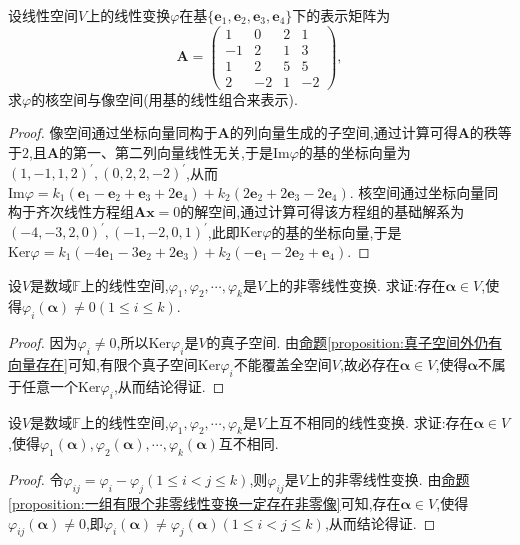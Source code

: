 \documentclass[lang=cn,newtx,10pt,scheme=chinese]{elegantbook}
\begin{document}
\begin{example}
设线性空间\(V\)上的线性变换\(\varphi\)在基\(\{\boldsymbol{e}_1,\boldsymbol{e}_2,\boldsymbol{e}_3,\boldsymbol{e}_4\}\)下的表示矩阵为
\[
\boldsymbol{A}=\begin{pmatrix}
1&0&2&1\\
-1&2&1&3\\
1&2&5&5\\
2&-2&1&-2
\end{pmatrix},
\]
求\(\varphi\)的核空间与像空间(用基的线性组合来表示).
\end{example}
\begin{proof}
    像空间通过坐标向量同构于\(\boldsymbol{A}\)的列向量生成的子空间,通过计算可得\(\boldsymbol{A}\)的秩等于\(2\),且\(\boldsymbol{A}\)的第一、第二列向量线性无关,于是\(\text{Im}\varphi\)的基的坐标向量为\((1,-1,1,2)^\prime,(0,2,2,-2)^\prime\),从而\(\text{Im}\varphi = k_1(\boldsymbol{e}_1 - \boldsymbol{e}_2 + \boldsymbol{e}_3 + 2\boldsymbol{e}_4)+k_2(2\boldsymbol{e}_2 + 2\boldsymbol{e}_3 - 2\boldsymbol{e}_4)\). 核空间通过坐标向量同构于齐次线性方程组\(\boldsymbol{A}\boldsymbol{x}=0\)的解空间,通过计算可得该方程组的基础解系为\((-4,-3,2,0)^\prime,(-1,-2,0,1)^\prime\),此即\(\text{Ker}\varphi\)的基的坐标向量,于是\(\text{Ker}\varphi = k_1(-4\boldsymbol{e}_1 - 3\boldsymbol{e}_2 + 2\boldsymbol{e}_3)+k_2(-\boldsymbol{e}_1 - 2\boldsymbol{e}_2 + \boldsymbol{e}_4)\).
\end{proof}

\begin{proposition}\label{proposition:一组有限个非零线性变换一定存在非零像}
设\(V\)是数域\(\mathbb{F}\)上的线性空间,\(\varphi_1,\varphi_2,\cdots,\varphi_k\)是\(V\)上的非零线性变换. 求证:存在\(\boldsymbol{\alpha}\in V\),使得\(\varphi_i(\boldsymbol{\alpha})\neq 0(1\leq i\leq k)\).
\end{proposition}
\begin{proof}
    因为\(\varphi_i\neq 0\),所以\(\text{Ker}\varphi_i\)是\(V\)的真子空间. 由\hyperref[proposition:真子空间外仍有向量存在]{命题\ref{proposition:真子空间外仍有向量存在}}可知,有限个真子空间\(\text{Ker}\varphi_i\)不能覆盖全空间\(V\),故必存在\(\boldsymbol{\alpha}\in V\),使得\(\boldsymbol{\alpha}\)不属于任意一个\(\text{Ker}\varphi_i\),从而结论得证.
\end{proof}

\begin{proposition}\label{proposition:一组有限个非零线性变换一定存在互不相同的像}
    设\(V\)是数域\(\mathbb{F}\)上的线性空间,\(\varphi_1,\varphi_2,\cdots,\varphi_k\)是\(V\)上互不相同的线性变换. 求证:存在\(\boldsymbol{\alpha}\in V\),使得\(\varphi_1(\boldsymbol{\alpha}),\varphi_2(\boldsymbol{\alpha}),\cdots,\varphi_k(\boldsymbol{\alpha})\)互不相同.
\end{proposition}
\begin{proof}
    令\(\varphi_{ij}=\varphi_i - \varphi_j(1\leq i<j\leq k)\),则\(\varphi_{ij}\)是\(V\)上的非零线性变换. 由\hyperref[proposition:一组有限个非零线性变换一定存在非零像]{命题\ref{proposition:一组有限个非零线性变换一定存在非零像}}可知,存在\(\boldsymbol{\alpha}\in V\),使得\(\varphi_{ij}(\boldsymbol{\alpha})\neq 0\),即\(\varphi_i(\boldsymbol{\alpha})\neq\varphi_j(\boldsymbol{\alpha})(1\leq i<j\leq k)\),从而结论得证. 
\end{proof}
\end{document}
